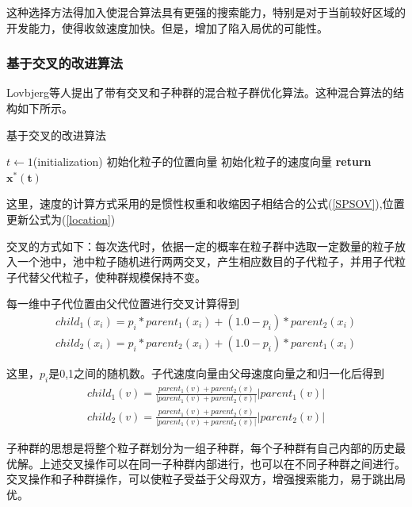 这种选择方法得加入使混合算法具有更强的搜索能力，特别是对于当前较好区域的开发能力，使得收敛速度加快。但是，增加了陷入局优的可能性。

\subsubsection{基于交叉的改进算法}
Lovbjerg\cite{Leboucher2018An}等人提出了带有交叉和子种群的混合粒子群优化算法。这种混合算法的结构如下所示。

\renewcommand{\algorithmcfname}{算法}%
\begin{algorithm}[H]
	\caption{基于交叉的改进算法}
	$t\gets 1$(initialization)\;
	初始化粒子的位置向量\;
	初始化粒子的速度向量\;
	\textbf{return $\bm{x^*(t)}$}\;
\end{algorithm}

这里，速度的计算方式采用的是惯性权重和收缩因子相结合的公式(\ref{SPSOV}),位置更新公式为(\ref{location})

交叉的方式如下：每次迭代时，依据一定的概率在粒子群中选取一定数量的粒子放入一个池中，池中粒子随机进行两两交叉，产生相应数目的子代粒子，并用子代粒子代替父代粒子，使种群规模保持不变。

每一维中子代位置由父代位置进行交叉计算得到
\begin{equation}
\begin{split}
child_1(x_i)=p_i*parent_1(x_i)+(1.0-p_i)*parent_2(x_i)\\
child_2(x_i)=p_i*parent_2(x_i)+(1.0-p_i)*parent_1(x_i)
\end{split}
\end{equation}

这里，$p_i$是0,1之间的随机数。子代速度向量由父母速度向量之和归一化后得到
\begin{equation}
\begin{split}
child_1(v)=\frac{parent_1(v)+parent_2(v)}{|parent_1(v)+parent_2(v)|}|parent_1(v)|\\
child_2(v)=\frac{parent_1(v)+parent_2(v)}{|parent_1(v)+parent_2(v)|}|parent_2(v)|
\end{split}
\end{equation}

子种群的思想是将整个粒子群划分为一组子种群，每个子种群有自己内部的历史最优解。上述交叉操作可以在同一子种群内部进行，也可以在不同子种群之间进行。交叉操作和子种群操作，可以使粒子受益于父母双方，增强搜索能力，易于跳出局优。
